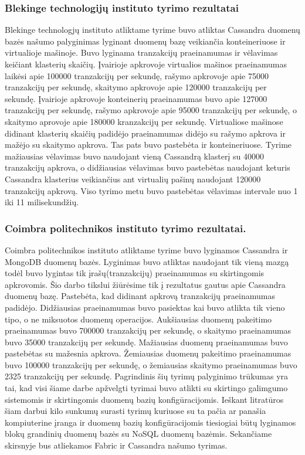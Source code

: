 \documentclass{VUMIFPSkursinis}
\begin{document}
		\subsubsection{Blekinge technologijų instituto tyrimo rezultatai}
			Blekinge technologjų instituto atliktame tyrime \cite{BITCass} buvo atliktas Cassandra duomenų bazės našumo palyginimas lyginant duomenų bazę  veikiančia konteineriuose ir 				virtualioje mašinoje. Buvo lyginama tranzakcijų praeinamumas ir vėlavimas keičiant klasterių skaičių. Įvairioje apkrovoje virtualios mašinos praeinamumas laikėsi apie 100000 					tranzakcijų per sekundę, rašymo apkrovoje apie 75000 tranzakcijų per sekundę, skaitymo apkrovoje apie 120000 tranzakcijų per sekundę.
			Įvairioje apkrovoje konteinerių praeinamumas buvo apie 127000 tranzakcijų per sekundę, rašymo apkrovoje apie 95000 tranzakcijų per sekundę, o skaitymo aprovoje apie 					180000 kranzakcijų per sekundę. Virtualiose mašinose didinant klasterių skaičių padidėjo praeinamumas didėjo su rašymo apkrova ir mažėjo su skaitymo apkrova. Tas pats 					buvo pastebėta ir konteineriuose.
			\newline
			Tyrime mažiausias vėlavimas buvo naudojant vieną Cassandrą klasterį su 40000 tranzakcijų apkrova, o didžiausias vėlavimas buvo pastebėtas naudojant keturis Cassandra 					klasterius veikiančius ant virtualių pašinų naudojant 120000 tranzakcijų apkrovą. 
			Viso tyrimo metu buvo pastebėtas vėlavimas intervale nuo 1 iki 11 milisekundžių.
		\subsubsection{Coimbra politechnikos instituto tyrimo rezultatai.}
			Coimbra politechnikos instituto atliktame tyrime \cite{MonCas} buvo lyginamos Cassandra ir MongoDB duomenų bazės. 
			Lyginimas buvo atliktas naudojant tik vieną mazgą todėl buvo lygintas tik įrašų(tranzakcijų) praeinamumas su skirtingomis apkrovomis. 
			Šio darbo tikslui žiūrėsime tik į rezultatus gautus apie Cassandra duomenų bazę. Pastebėta, kad didinant apkrovą tranzakcijų praeinamumas padidėjo. 
			Didžiausias praeinamumas buvo pasiektas kai buvo atlikta tik vieno tipo, o ne miksuotos duomenų operacijos.
			Aukšiausias duomenų pakeitimo praeinamumas buvo 700000 tranzakcijų per sekundę, o skaitymo praeinamumas buvo 35000 tranzakcijų per sekundę.
			Mažiausias duomenų praeinamumas buvo pastebėtas su mažesnia apkrova.
			Žemiausias duomenų pakeitimo praeinamumas buvo 100000 tranzakcijų per sekundę, o žemiausias skaitymo praeinamumas buvo 2325 tranzakcijų per sekundę.
			\newline
			Pagrindinis šių tyrimų palyginimo trūkumas yra tai, kad visi šiame darbe apžvelgti tyrimai buvo atlikti su skirtingo galimgumo sistemomis ir skirtingomis duomenų bazių 						konfigūracijomis. 
			Ieškant litratūros šiam darbui kilo sunkumų surasti tyrimų kuriuose su ta pačia ar panašia kompiuterine įranga ir duomenų bazių konfigūracijomis tiesiogiai būtų lyginamos blokų 					grandinių duomenų bazės su NoSQL duomenų bazėmis. Sekančiame skirsnyje bus atliekamos Fabric ir Cassandra našumo tyrimas.
\end{document}

